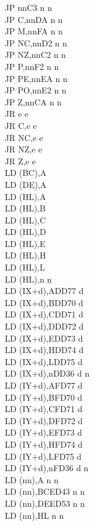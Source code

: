 \documentclass[12pt,twoside,openright,a4paper]{book}
\begin{document}
\begin{multicols}{3}
{\begin{tabbing}
	JP nn\>C3 n n\\
	JP C,nn\>DA n n\\
	JP M,nn\>FA n n\\
	JP NC,nn\>D2 n n\\
	JP NZ,nn\>C2 n n\\
	JP P,nn\>F2 n n\\
	JP PE,nn\>EA n n\\
	JP PO,nn\>E2 n n\\
	JP Z,nn\>CA n n\\
	JR e e\\
	JR C,e e\\
	JR NC,e e\\
	JR NZ,e e\\
	JR Z,e e\\
	LD (BC),A\\
	LD (DE),A\\
	LD (HL),A\\
	LD (HL),B\\
	LD (HL),C\\
	LD (HL),D\\
	LD (HL),E\\
	LD (HL),H\\
	LD (HL),L\\
	LD (HL),n n\\
	LD (IX+d),A\>DD77 d\\
	LD (IX+d),B\>DD70 d\\
	LD (IX+d),C\>DD71 d\\
	LD (IX+d),D\>DD72 d\\
	LD (IX+d),E\>DD73 d\\
	LD (IX+d),H\>DD74 d\\
	LD (IX+d),L\>DD75 d\\
	LD (IX+d),n\>DD36 d n\\
	LD (IY+d),A\>FD77 d\\
	LD (IY+d),B\>FD70 d\\
	LD (IY+d),C\>FD71 d\\
	LD (IY+d),D\>FD72 d\\
	LD (IY+d),E\>FD73 d\\
	LD (IY+d),H\>FD74 d\\
	LD (IY+d),L\>FD75 d\\
	LD (IY+d),n\>FD36 d n\\
	LD (nn),A n n\\
	LD (nn),BC\>ED43 n n\\
	LD (nn),DE\>ED53 n n\\
	LD (nn),HL n n\\

\end{tabbing}}
\end{multicols}
\end{document}

